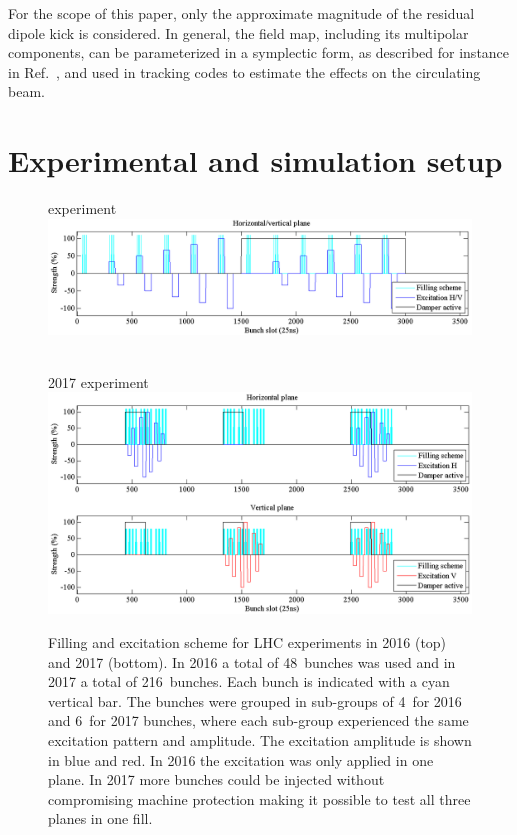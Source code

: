 \documentclass[%
 reprint,
 amsmath,amssymb,
 aps,
prstab,
]{revtex4-1}
\begin{document}
For the scope of this paper, only the approximate magnitude of the
residual dipole kick is considered. In general, the field map,
including its multipolar components, can be parameterized in a
symplectic form, as described for instance in
Ref.~\cite{hel_bends_stancari}, and used in tracking codes to estimate
the effects on the circulating beam.


\section{Experimental and simulation setup\label{sec:exp}}
\begin{figure}
	\begin{minipage}[t]{1.0\linewidth}
		 experiment\\
		\includegraphics[width=0.9\linewidth]{bunchfilling_2016.png}	
	\end{minipage}
	\begin{minipage}[t]{1.0\linewidth}
		\centering
		$ $\\
		2017 experiment\\
		\includegraphics[width=0.9\linewidth]{bunchfilling_2017.png}	
	\end{minipage}
	\caption{\label{fig:fill} Filling and excitation scheme for LHC experiments in 2016 (top) and 2017 (bottom). In 2016 a total of 48~bunches was used and in 2017 a total of 216~bunches. Each bunch is indicated with a cyan vertical bar. The bunches were grouped in sub-groups of 4~for 2016 and 6~for 2017 bunches, where each sub-group experienced the same excitation pattern and amplitude. The excitation amplitude is shown in blue and red. In 2016 the excitation was only applied in one plane. In 2017 more bunches could be injected without compromising machine protection making it possible to test all three planes in one fill.}
\end{figure}
\end{document}
